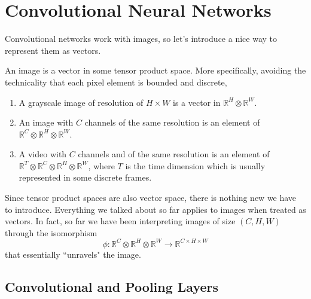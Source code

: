 \section{Convolutional Neural Networks}

  Convolutional networks work with images, so let's introduce a nice way to represent them as vectors. 

  \begin{definition}[Image]
    An image is a vector in some tensor product space. More specifically, avoiding the technicality that each pixel element is bounded and discrete,  

    \begin{enumerate}
      \item A grayscale image of resolution of $H \times W$ is a vector in $\mathbb{R}^{H} \otimes \mathbb{R}^{W}$. 

      \item An image with $C$ channels of the same resolution is an element of $\mathbb{R}^{C} \otimes \mathbb{R}^H \otimes \mathbb{R}^W$. 

      \item A video with $C$ channels and of the same resolution is an element of $\mathbb{R}^T \otimes \mathbb{R}^C \otimes \mathbb{R}^H \otimes \mathbb{R}^W$, where $T$ is the time dimension which is usually represented in some discrete frames.
    \end{enumerate}

    Since tensor product spaces are also vector space, there is nothing new we have to introduce. Everything we talked about so far applies to images when treated as vectors. In fact, so far we have been interpreting images of size $(C, H, W)$ through the isomorphism 
    \begin{equation}
      \phi: \mathbb{R}^{C} \otimes \mathbb{R}^H \otimes \mathbb{R}^W \rightarrow \mathbb{R}^{C \times H \times W}
    \end{equation}
    that essentially ``unravels" the image. 
  \end{definition}

\subsection{Convolutional and Pooling Layers} 

